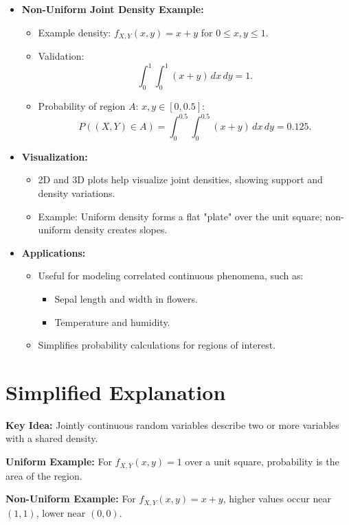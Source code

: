 \documentclass{article}
\begin{document}
\begin{itemize}
  \item \textbf{Non-Uniform Joint Density Example:}
    \begin{itemize}
      \item Example density: $f_{X,Y}(x,y) = x + y$ for $0 \leq x, y \leq 1$.
      \item Validation:
        \[
          \int_0^1 \int_0^1 (x + y) \, dx \, dy = 1.
        \]
      \item Probability of region $A$: $x, y \in [0, 0.5]$:
        \[
          P((X, Y) \in A) = \int_0^{0.5} \int_0^{0.5} (x + y) \, dx \, dy = 0.125.
        \]
    \end{itemize}

  \item \textbf{Visualization:}
    \begin{itemize}
      \item 2D and 3D plots help visualize joint densities, showing support and density variations.
      \item Example: Uniform density forms a flat "plate" over the unit square; non-uniform density creates slopes.
    \end{itemize}

  \item \textbf{Applications:}
    \begin{itemize}
      \item Useful for modeling correlated continuous phenomena, such as:
        \begin{itemize}
          \item Sepal length and width in flowers.
          \item Temperature and humidity.
        \end{itemize}
      \item Simplifies probability calculations for regions of interest.
    \end{itemize}
\end{itemize}

\section*{Simplified Explanation}

\textbf{Key Idea:}
Jointly continuous random variables describe two or more variables with a shared density.

\textbf{Uniform Example:}
For $f_{X,Y}(x,y) = 1$ over a unit square, probability is the area of the region.

\textbf{Non-Uniform Example:}
For $f_{X,Y}(x,y) = x + y$, higher values occur near $(1,1)$, lower near $(0,0)$.
\end{document}
